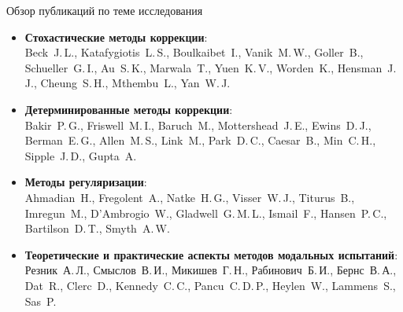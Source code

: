 \begin{frame}{Обзор публикаций по теме исследования}
	\begin{itemize}
		\item \textbf{Стохастические методы коррекции}: \\ Beck~J.\,L., Katafygiotis~L.\,S., Boulkaibet~I., Vanik~M.\,W., Goller~B., Schueller~G.\,I., Au~S.\,K., Marwala~T., Yuen~K.\,V., Worden~K., Hensman~J.\,J., Cheung~S.\,H., Mthembu~L., Yan~W.\,J.
		\item \textbf{Детерминированные методы коррекции}: \\ Bakir~P.\,G., Friswell~M.\,I., Baruch~M., Mottershead~J.\,E., Ewins~D.\,J., Berman~E.\,G., Allen~M.\,S., Link~M., Park~D.\,C., Caesar~B., Min~C.\,H., Sipple~J.\,D., Gupta~A.
		\item \textbf{Методы регуляризации}: \\ Ahmadian~H., Fregolent~A., Natke~H.\,G., Visser~W.\,J., Titurus~B., Imregun~M., D'Ambrogio~W., Gladwell~G.\,M.\,L., Ismail~F., Hansen~P.\,C., Bartilson~D.\,T., Smyth~A.\,W.
		\item \textbf{Теоретические и практические аспекты методов модальных испытаний}: \\ Резник~А.\,Л., Смыслов~В.\,И., Микишев~Г.\,Н., Рабинович~Б.\,И., Бернс~В.\,А., Dat~R., Clerc~D., Kennedy~C.\,C., Pancu~C.\,D.\,P., Heylen~W., Lammens~S., Sas~P.
	\end{itemize}
\end{frame}